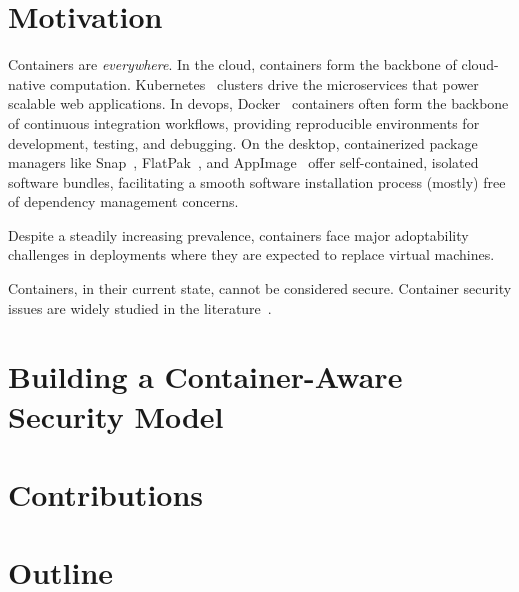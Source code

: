 \section{Motivation}%
\label{s:motivation}

\begin{inprogress}
Containers are \textit{everywhere}. In the cloud, containers form the backbone of
cloud-native computation. Kubernetes~ clusters drive the microservices that
power scalable web applications. In devops, Docker~ containers often form the
backbone of continuous integration workflows, providing reproducible environments for
development, testing, and debugging. On the desktop, containerized package managers like
Snap~, FlatPak~, and AppImage~ offer self-contained,
isolated software bundles, facilitating a smooth software installation process (mostly)
free of dependency management concerns.

Despite a steadily increasing prevalence, containers face major adoptability challenges in
deployments where they are expected to replace virtual machines.

Containers, in their current state, cannot be considered secure.
Container security issues are widely studied in the literature~.
\end{inprogress}


\section{Building a Container-Aware Security Model}%
\label{s:container-aware}


\section{Contributions}%
\label{s:contributions}


\section{Outline}%
\label{s:outline}
